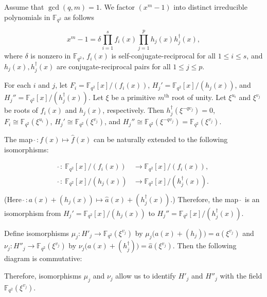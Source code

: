 \documentclass[a4paper,12pt]{article}
\begin{document}
Assume that $\gcd(q,m)=1$. We factor $(x^m-1)$ into distinct irreducible polynomials in $\mathbb{F}_{q^2}$ as follows 

$$
x^m-1= \delta \prod_{i=1}^sf_i(x) \prod_{j=1}^p h_j(x)h^{\dagger}_j(x),
$$
where $\delta$ is nonzero in $\mathbb{F}_{q^2}$, $f_i(x)$ is self-conjugate-reciprocal for all $1\le i \le s$, and  $h_j(x), h_j^{\dagger}(x)$ are conjugate-reciprocal  pairs for all $1 \le j \le p$.

For each $i$ and $j$, let $F_i=\mathbb{F}_{q^2}[x]/ (f_i(x) )$, 
$H_j'= \mathbb{F}_{q^2}[x]/ (h_j(x) )$,   and
$H_j''= \mathbb{F}_{q^2}[x]/ (h_j^{\dagger}(x) )$. 
Let $\xi$ be a primitive $m^{\text{th}}$ root of unity.
Let $\xi^{u_i}$ and  $\xi^{v_j}$ be roots of $f_i(x)$ and $h_j(x)$, respectively.
Then $h_j^{\dagger}(\xi^{-qv_j})=0$,
$F_i \cong \mathbb{F}_{q^2}(\xi^{u_i})$,  $H_j' \cong \mathbb{F}_{q^2}(\xi^{v_j})$,  and 
$H_j'' \cong \mathbb{F}_{q^2}(\xi^{-qv_j}) = \mathbb{F}_{q^2}(\xi^{v_j})$. 


The map $\hat\ : f(x) \mapsto \hat{f}(x)$ can be naturally extended to the following isomorphisms:   

\begin{equation}
	\begin{split}
		\hat\  :\  \mathbb{F}_{q^2}[x]/ (f_i(x) )&\to \mathbb{F}_{q^2}[x]/ (f_i (x)) ,\\
		\hat\  :\  \mathbb{F}_{q^2}[x]/ (h_j(x) )&\to \mathbb{F}_{q^2}[x]/ (h_j^{\dagger}(x) ) .\\
	\end{split}
\end{equation} 
(Here $\hat\  : a(x) + (h_j(x) )\mapsto \hat{a}(x) + (h_j^{\dagger}(x) )$.)  
Therefore, the map $\hat\ $ is an isomorphism from $H_j'=\mathbb{F}_{q^2}[x]/ ( h_j(x) )$ to 
$H_j''=\mathbb{F}_{q^2}[x]/ ( h_j^\dagger(x) )$. 

Define isomorphisms $\mu_j : H'_j \to \mathbb{F}_{q^2}(\xi^{v_j})$ by $\mu_j\big(a(x) + (h_j)\big) =a(\xi^{v_j})$ and 
$\nu_j : H''_j \to \mathbb{F}_{q^2}(\xi^{v_j})$ by $\nu_j\big(a(x) + (h_j^{\dagger})\big) =\hat{a}(\xi^{v_j})$. 
Then the following diagram is commutative:
\begin{center}
\end{center}
Therefore, isomorphisms $\mu_j$ and $\nu_j$ allow us to identify $H'_j$ and $H''_j$ with the field $\mathbb{F}_{q^2}(\xi^{v_j})$.  
\end{document}
